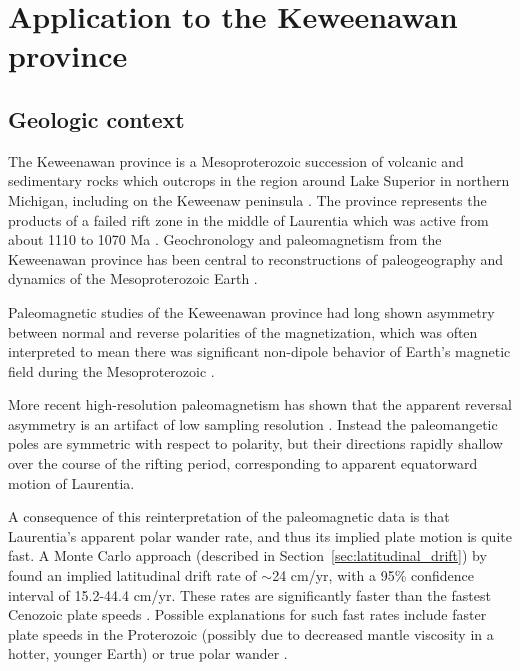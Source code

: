 \documentclass[preprint,12pt,authoryear]{elsarticle}
\begin{document}
\section{Application to the Keweenawan province}
\label{sec:keweenawan}
\subsection{Geologic context}
The Keweenawan province is a Mesoproterozoic succession of volcanic and sedimentary rocks
which outcrops in the region around Lake Superior in northern Michigan, including on the Keweenaw peninsula \citep{henry1977paleomagnetism}.
The province represents the products of a failed rift zone in the middle of Laurentia which was active
from about 1110 to 1070 Ma \citep{swanson2014magmatic}.
Geochronology and paleomagnetism from the Keweenawan province has been central to reconstructions
of paleogeography and dynamics of the Mesoproterozoic Earth \citep[e.g.][]{li2008assembly, evans2009palaeomagnetically}.

Paleomagnetic studies of the Keweenawan province had long shown asymmetry between normal and
reverse polarities of the magnetization, which was often interpreted to mean there was significant 
non-dipole behavior of Earth's magnetic field during the Mesoproterozoic \citep{pesonen1981late, nevanlinna1983late, pesonen1983geomagnetic}.

More recent high-resolution paleomagnetism has shown that the apparent reversal asymmetry
is an artifact of low sampling resolution \citep{swanson2009no, kulakov2013paleomagnetism}. 
Instead the paleomangetic poles are symmetric with respect to polarity,
but their directions rapidly shallow over the course of the rifting period,
corresponding to apparent equatorward motion of Laurentia.

A consequence of this reinterpretation of the paleomagnetic data is that Laurentia's apparent
polar wander rate, and thus its implied plate motion is quite fast.
A Monte Carlo approach (described in Section~\ref{sec:latitudinal_drift}) by \citet{swanson2014confirmation}
found an implied latitudinal drift rate of $\sim$24 cm/yr, with a 95\% confidence interval of 15.2-44.4 cm/yr.
These rates are significantly faster than the fastest Cenozoic plate speeds \citep{zahirovic2015tectonic}.
Possible explanations for such fast rates include faster plate speeds in the Proterozoic (possibly due to decreased
mantle viscosity in a hotter, younger Earth) or true polar wander \citet{swanson2009no}.
\end{document}
